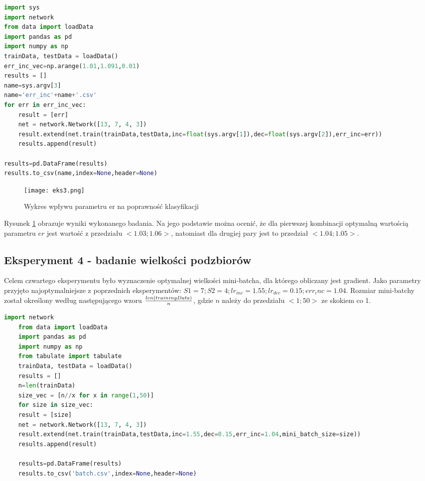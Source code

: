 \documentclass[12pt,twoside]{article}
\begin{document}
\begin{lstlisting}[language=Python,caption=Algorytm realizujący eksperyment 3,label={eks3}]
import sys
import network
from data import loadData
import pandas as pd
import numpy as np
trainData, testData = loadData()
err_inc_vec=np.arange(1.01,1.091,0.01)
results = []
name=sys.argv[3]
name='err_inc'+name+'.csv'
for err in err_inc_vec:
	result = [err]
	net = network.Network([13, 7, 4, 3])
	result.extend(net.train(trainData,testData,inc=float(sys.argv[1]),dec=float(sys.argv[2]),err_inc=err))
	results.append(result)

results=pd.DataFrame(results)
results.to_csv(name,index=None,header=None)

\end{lstlisting}

\begin{figure}[H]
\centering
\texttt{[image: eks3.png]}
\caption{Wykres wpływu parametru er na poprawność klasyfikacji}
\label{ryseks3}
\end{figure}

Rysunek \ref{ryseks3} obrazuje wyniki wykonanego badania.
Na jego podstawie można ocenić, że dla pierwszej kombinacji optymalną wartością parametru $er$ jest wartość z przedziału $<1.03;1.06>$, natomiast dla drugiej pary jest to przedział $<1.04;1.05>$.


\subsection{Eksperyment 4 - badanie wielkości podzbiorów}
Celem czwartego eksperymentu było wyznaczenie optymalnej wielkości mini-batcha, dla którego obliczany jest gradient. Jako parametry przyjęto najoptymalniejsze z poprzednich eksperymentów: $S1 = 7; S2=4; lr_{inc}=1.55; lr_{dec}=0.15; err_inc=1.04$. Rozmiar mini-batchy został określony według następującego wzoru $len(trainingData)\over{n}$, gdzie $n$ należy do przedziału $<1; 50>$ ze skokiem co 1.

\begin{lstlisting}[language=Python,caption=Algorytm realizujący eksperyment 3,label={eks4}]
	import network
	from data import loadData
	import pandas as pd
	import numpy as np
	from tabulate import tabulate
	trainData, testData = loadData()
	results = []
	n=len(trainData)
	size_vec = [n//x for x in range(1,50)]
	for size in size_vec:
	result = [size]
	net = network.Network([13, 7, 4, 3])
	result.extend(net.train(trainData,testData,inc=1.55,dec=0.15,err_inc=1.04,mini_batch_size=size))
	results.append(result)
	
	results=pd.DataFrame(results)
	results.to_csv('batch.csv',index=None,header=None)
	
	
\end{lstlisting}
\end{document}
